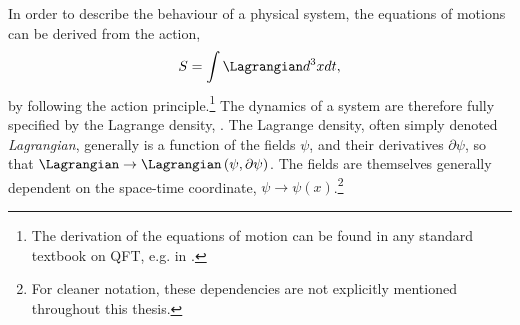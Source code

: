 In order to describe the behaviour of a physical system, the equations of motions can be derived from the action,
\begin{equation}
  \label{eq:action}
  S = \int \Lagrangian d^3x dt,
\end{equation}
by following the action principle.\footnote{The derivation of the equations of motion can be found in any standard textbook on QFT, e.g. in .}
The dynamics of a system are therefore fully specified by the Lagrange density, \Lagrangian. The Lagrange density, often simply denoted \emph{Lagrangian}, generally is a function of the fields $\psi$, and their derivatives $\partial \psi$, so that $\Lagrangian \rightarrow \Lagrangian\left(\psi, \partial\psi\right)$. The fields are themselves generally dependent on the space-time coordinate, $\psi \rightarrow \psi(x)$.\footnote{For cleaner notation, these dependencies are not explicitly mentioned throughout this thesis.}

